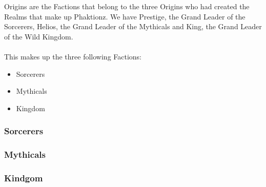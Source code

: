 Origins are the Factions that belong to the three Origins who had created the Realms 
that make up Phaktionz. We have Prestige, the Grand Leader of the Sorcerers, Helios,
the Grand Leader of the Mythicals and King, the Grand Leader of the Wild Kingdom. 
\\\\
This makes up the three following Factions: 
\begin{itemize}
    \item Sorcerers
    \item Mythicals
    \item Kingdom 
\end{itemize}

\subsubsection*{Sorcerers}


\subsubsection*{Mythicals}


\subsubsection*{Kindgom}
